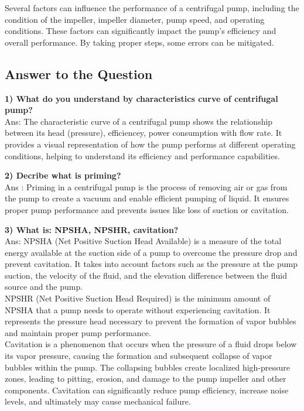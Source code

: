 \documentclass[12pt]{article}
\begin{document}
Several factors can influence the performance of a centrifugal pump, including the condition of the impeller, impeller diameter, pump speed, and operating conditions. These factors can significantly impact the pump's efficiency and overall performance. By taking proper steps, some errors can be mitigated. 
\pagebreak
\subsection*{Answer to the Question}
\hspace*{0.5cm} \textbf{1) What do you understand by characteristics curve of centrifugal pump?}\\
Ans: The characteristic curve of a centrifugal pump shows the relationship between its head (pressure), efficiencey, power consumption with flow rate. It provides a visual representation of how the pump performs at different operating conditions, helping to understand its efficiency and performance capabilities.


\vspace*{.5cm}
\textbf{2) Decribe what is priming?}\\
Ans : Priming in a centrifugal pump is the process of removing air or gas from the pump to create a vacuum and enable efficient pumping of liquid. It ensures proper pump performance and prevents issues like loss of suction or cavitation.

\vspace*{.5cm}

\textbf{3) What is: NPSHA, NPSHR, cavitation?}\\
Ans: NPSHA (Net Positive Suction Head Available) is a measure of the total energy available at the suction side of a pump to overcome the pressure drop and prevent cavitation. It takes into account factors such as the pressure at the pump suction, the velocity of the fluid, and the elevation difference between the fluid source and the pump.\\

NPSHR (Net Positive Suction Head Required) is the minimum amount of NPSHA that a pump needs to operate without experiencing cavitation. It represents the pressure head necessary to prevent the formation of vapor bubbles and maintain proper pump performance.\\

Cavitation is a phenomenon that occurs when the pressure of a fluid drops below its vapor pressure, causing the formation and subsequent collapse of vapor bubbles within the pump. The collapsing bubbles create localized high-pressure zones, leading to pitting, erosion, and damage to the pump impeller and other components. Cavitation can significantly reduce pump efficiency, increase noise levels, and ultimately may cause mechanical failure.
\end{document}

